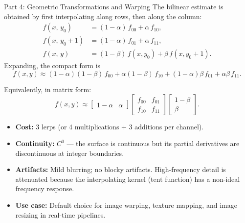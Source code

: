 \documentclass[letterpaper]{article}
\begin{document}
\begin{notes}{Part 4: Geometric Transformations and Warping}
The bilinear estimate is obtained by first interpolating along rows, then along the column:
\begin{align*}
    f(x,\,y_0)   &= (1-\alpha)\,f_{00} + \alpha\,f_{10}, \\
    f(x,\,y_0{+}1) &= (1-\alpha)\,f_{01} + \alpha\,f_{11}, \\
    f(x,\,y)      &= (1-\beta)\,f(x,y_0) + \beta\,f(x,y_0{+}1).
\end{align*}
Expanding, the compact form is
$$f(x,y) \approx (1{-}\alpha)(1{-}\beta)\,f_{00} + \alpha(1{-}\beta)\,f_{10} + (1{-}\alpha)\beta\,f_{01} + \alpha\beta\,f_{11}.$$


Equivalently, in matrix form:
$$f(x,y) \approx
\begin{bmatrix}1-\alpha & \alpha\end{bmatrix}
\begin{bmatrix}f_{00} & f_{01}\\ f_{10} & f_{11}\end{bmatrix}
\begin{bmatrix}1-\beta\\ \beta\end{bmatrix}.$$


\begin{itemize}
    \item \textbf{Cost:} 3 lerps (or 4 multiplications + 3 additions per channel).
    \item \textbf{Continuity:} $C^0$ — the surface is continuous but its partial derivatives are discontinuous at integer boundaries.
    \item \textbf{Artifacts:} Mild blurring; no blocky artifacts. High-frequency detail is attenuated because the interpolating kernel (tent function) has a non-ideal frequency response.
    \item \textbf{Use case:} Default choice for image warping, texture mapping, and image resizing in real-time pipelines.
\end{itemize}



\end{notes}
\end{document}
